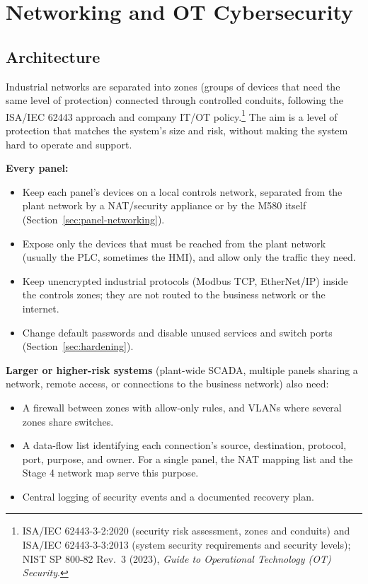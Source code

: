 \chapter{Networking and OT Cybersecurity}\label{ch:networking}
\section{Architecture}\label{sec:net-architecture}
Industrial networks are separated into zones (groups of devices that need the same level of protection) connected through controlled conduits, following the ISA/IEC 62443 approach and company IT/OT policy.\footnote{ISA/IEC 62443-3-2:2020 (security risk assessment, zones and conduits) and ISA/IEC 62443-3-3:2013 (system security requirements and security levels); NIST SP 800-82 Rev.~3 (2023), \emph{Guide to Operational Technology (OT) Security}.} The aim is a level of protection that matches the system's size and risk, without making the system hard to operate and support.

\textbf{Every panel:}
\begin{itemize}[itemsep=1pt]
  \item Keep each panel's devices on a local controls network, separated from the plant network by a NAT/security appliance or by the M580 itself (Section~\ref{sec:panel-networking}).
  \item Expose only the devices that must be reached from the plant network (usually the PLC, sometimes the HMI), and allow only the traffic they need.
  \item Keep unencrypted industrial protocols (Modbus TCP, EtherNet/IP) inside the controls zones; they are not routed to the business network or the internet.
  \item Change default passwords and disable unused services and switch ports (Section~\ref{sec:hardening}).
\end{itemize}

\textbf{Larger or higher-risk systems} (plant-wide SCADA, multiple panels sharing a network, remote access, or connections to the business network) also need:
\begin{itemize}[itemsep=1pt]
  \item A firewall between zones with allow-only rules, and VLANs where several zones share switches.
  \item A data-flow list identifying each connection's source, destination, protocol, port, purpose, and owner. For a single panel, the NAT mapping list and the Stage 4 network map serve this purpose.
  \item Central logging of security events and a documented recovery plan.
\end{itemize}


